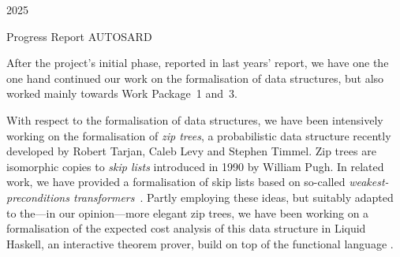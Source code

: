 \documentclass[10pt,a4paper]{article}
\begin{document}

\vspace*{23mm}
\noindent\hspace{35ex}
2025

\vspace*{10mm}

\begin{center}
\large \normalsize Progress Report AUTOSARD 
\end{center}

After the project's initial phase, reported in last years' report, we have
one the one hand continued our work on the formalisation of data structures, but also worked mainly
towards Work Package~1 and~3.

With respect to the formalisation of data structures, we have been intensively working
on the formalisation of \emph{zip trees}, a probabilistic data structure recently developed
by Robert Tarjan, Caleb Levy and Stephen Timmel. Zip trees are isomorphic copies to
\emph{skip lists} introduced in 1990 by William Pugh.
%
In related work, we have provided a formalisation of skip lists based on so-called \emph{weakest-preconditions transformers}~\cite{AvanziniBGMV24}. Partly employing these ideas, but suitably adapted
to the---in our opinion---more elegant zip trees, we have been working on
a formalisation of the expected cost analysis of this data structure in Liquid Haskell, an interactive theorem prover, build on top of the functional
language \Haskell.
\end{document}
